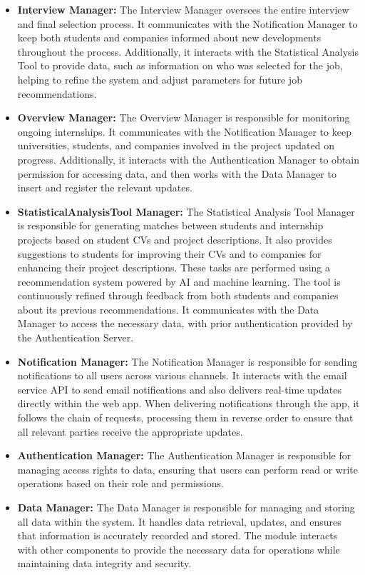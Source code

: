 \begin{itemize}
    \item \textbf{Interview Manager:} The Interview Manager oversees the entire interview and final selection process. It communicates with the Notification Manager to keep both students and companies informed about new developments throughout the process. Additionally, it interacts with the Statistical Analysis Tool to provide data, such as information on who was selected for the job, helping to refine the system and adjust parameters for future job recommendations.
    \item \textbf{Overview Manager:} The Overview Manager is responsible for monitoring ongoing internships. It communicates with the Notification Manager to keep universities, students, and companies involved in the project updated on progress. Additionally, it interacts with the Authentication Manager to obtain permission for accessing data, and then works with the Data Manager to insert and register the relevant updates.
    \item \textbf{StatisticalAnalysisTool Manager:} The Statistical Analysis Tool Manager is responsible for generating matches between students and internship projects based on student CVs and project descriptions. It also provides suggestions to students for improving their CVs and to companies for enhancing their project descriptions. These tasks are performed using a recommendation system powered by AI and machine learning. The tool is continuously refined through feedback from both students and companies about its previous recommendations. It communicates with the Data Manager to access the necessary data, with prior authentication provided by the Authentication Server.
    \item \textbf{Notification Manager:} The Notification Manager is responsible for sending notifications to all users across various channels. It interacts with the email service API to send email notifications and also delivers real-time updates directly within the web app. When delivering notifications through the app, it follows the chain of requests, processing them in reverse order to ensure that all relevant parties receive the appropriate updates.
    \item \textbf{Authentication Manager:} The Authentication Manager is responsible for managing access rights to data, ensuring that users can perform read or write operations based on their role and permissions.
    \item \textbf{Data Manager:} The Data Manager is responsible for managing and storing all data within the system. It handles data retrieval, updates, and ensures that information is accurately recorded and stored. The module interacts with other components to provide the necessary data for operations while maintaining data integrity and security.

\end{itemize}
